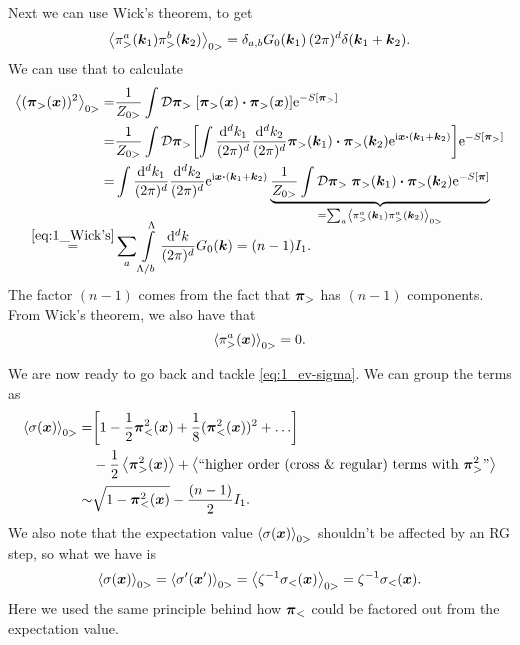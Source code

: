 \documentclass[11pt,letter, swedish, english
]{article}
\begin{document}
Next we can use Wick's theorem, to get
\begin{equation}\label{eq:1_Wick's}
\ev{\pi_>^a(\vb*k_1)\pi_>^b(\vb*k_2)}_{0>}
= \delta_{a, b} G_0(\vb*k_1) \,(2\pi)^d \delta(\vb*k_1 + \vb*k_2).
\end{equation}
We can use that to calculate
\begin{equation}
\begin{aligned}
\ev{(\vb*\pi_>(\vb*x))^2}_{0>} =& \frac{1}{Z_{0>}}
\int \mathcal{D}\vb*\pi_>\; 
[\vb*\pi_>(\vb*x)\vdot\vb*\pi_>(\vb*x)] \ee^{-S[\vb*\pi_>]}\\
=& \frac{1}{Z_{0>}} \int \mathcal{D}\vb*\pi_>
\qty[\int\frac{\rd^dk_1}{(2\pi)^d}\frac{\rd^dk_2}{(2\pi)^d}
\vb*\pi_>(\vb*k_1)\vdot\vb*\pi_>(\vb*k_2) \ee^{\ii\vb*x\vdot(\vb*k_1+\vb*k_2)}]
\ee^{-S[\vb*\pi_>]} \\
=& \int\frac{\rd^dk_1}{(2\pi)^d}\frac{\rd^dk_2}{(2\pi)^d}
\ee^{\ii\vb*x\vdot(\vb*k_1+\vb*k_2)}
\underbrace{\frac{1}{Z_{0>}} \int \mathcal{D}\vb*\pi_>\; 
\vb*\pi_>(\vb*k_1)\vdot\vb*\pi_>(\vb*k_2) 
\ee^{-S[\vb*\pi]}}_{=\sum_a\ev{\pi_>^a(\vb*k_1)\pi_>^a(\vb*k_2)}_{0>}}\\[-8pt]
\stackrel{\eqref{eq:1_Wick's}}{=}& 
\sum_a \int_{\Lambda/b}^\Lambda\frac{\rd^dk}{(2\pi)^d}G_0(\vb*k)
= (n-1) I_1.
\end{aligned}
\end{equation}
The factor $(n-1)$ comes from the fact that $\vb*\pi_>$ has $(n-1)$
components. From Wick's theorem, we also have that
\begin{equation}
\ev{\pi_>^a(\vb*x)}_{0>} = 0.
\end{equation}

We are now ready to go back and tackle \eqref{eq:1_ev-sigma}. We can
group the terms as
\begin{equation}\label{eq:1_ev-sigma2}
\begin{aligned}
\ev{\sigma(\vb*x)}_{0>} 
=& \qty[1 - \frac{1}{2}\vb*\pi_<^2(\vb*x) 
+ \frac{1}{8}(\vb*\pi_<^2(\vb*x))^2 +\ldots]\\
&- \frac{1}{2}\ev{\vb*\pi_>^2(\vb*x)} 
+\ev{\text{``higher order (cross \& regular) terms with }
\vb*\pi_>^2\text{''}}\\
\sim&\sqrt{1-\vb*\pi_<^2(\vb*x)} -\frac{(n-1)}{2} I_1.
\end{aligned}
\end{equation}
We also note that the expectation value $\ev{\sigma(\vb*x)}_{0>}$
shouldn't be affected by an RG step, so what we have is
\begin{equation}
\ev{\sigma(\vb*x)}_{0>} = \ev{\sigma'(\vb*x')}_{0>} 
= \ev{\zeta^{-1}\sigma_<(\vb*x)}_{0>} 
= \zeta^{-1}\sigma_<(\vb*x).
\end{equation}
Here we used the same principle behind how $\vb*\pi_<$ could be
factored out from the expectation value. 
\end{document}
